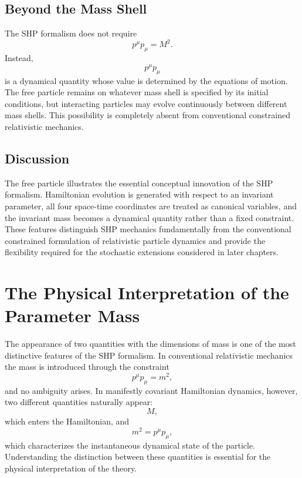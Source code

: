 \subsection{Beyond the Mass Shell}
The SHP formalism does not require
\[p^\mu p_\mu=M^2.
\]
Instead,
\[p^\mu p_\mu\]
is a dynamical quantity whose value is determined by the equations of
motion.
The free particle remains on whatever mass shell is specified by its
initial conditions, but interacting particles may evolve continuously
between different mass shells.
This possibility is completely absent from conventional constrained
relativistic mechanics.
\subsection{Discussion}
The free particle illustrates the essential conceptual innovation of the
SHP formalism.
Hamiltonian evolution is generated with respect to an invariant
parameter, all four space-time coordinates are treated as canonical
variables, and the invariant mass becomes a dynamical quantity rather
than a fixed constraint.
These features distinguish SHP mechanics fundamentally from the
conventional constrained formulation of relativistic particle dynamics
and provide the flexibility required for the stochastic extensions
considered in later chapters.
\section{The Physical Interpretation of the Parameter Mass}
The appearance of two quantities with the dimensions of mass is one of
the most distinctive features of the SHP formalism. In conventional
relativistic mechanics the mass is introduced through the constraint
\[p^\mu p_\mu = m^2,\]
and no ambiguity arises.
In manifestly covariant Hamiltonian dynamics, however, two different
quantities naturally appear:
\[M,\]
which enters the Hamiltonian,
and
\[m^2 = p^\mu p_\mu,\]
which characterizes the instantaneous dynamical state of the particle.
Understanding the distinction between these quantities is essential for
the physical interpretation of the theory.
